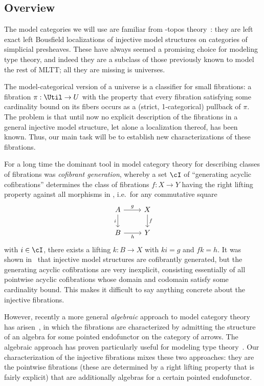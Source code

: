 \subsection{Overview}
\label{sec:overview}

The model categories we will use are familiar from \io-topos theory~\cite{lurie:higher-topoi}: they are left exact left Bousfield localizations of injective model structures on categories of simplicial presheaves.
These have always seemed a promising choice for modeling type theory, and indeed they are a subclass of those previously known to model the rest of MLTT; all they are missing is universes.

The model-categorical version of a universe is a classifier for small fibrations: a fibration $\pi:\Util\to U$ with the property that every fibration satisfying some cardinality bound on its fibers occurs as a (strict, 1-categorical) pullback of $\pi$.
The problem is that until now no explicit description of the fibrations in a general injective model structure, let alone a localization thereof, has been known.
Thus, our main task will be to establish new characterizations of these fibrations.

For a long time the dominant tool in model category theory for describing classes of fibrations was \emph{cofibrant generation}, whereby a set $\cI$ of ``generating acyclic cofibrations'' determines the class of fibrations $f:X\to Y$ having the right lifting property against all morphisms in \cI, i.e.\ for any commutative square
\begin{equation}
  \begin{tikzcd}
    A \ar[d,"i"'] \ar[r,"g"] & X \ar[d,"f"]\\
    B \ar[r,"h"'] & Y
  \end{tikzcd}\label{eq:intro-sq}
\end{equation}
with $i\in \cI$, there exists a lifting $k:B\to X$ with $k i = g$ and $f k = h$.
It was shown in~\cite[A.3.3.3]{lurie:higher-topoi} that injective model structures are cofibrantly generated, but the generating acyclic cofibrations are very inexplicit, consisting essentially of all pointwise acyclic cofibrations whose domain and codomain satisfy some cardinality bound.
This makes it difficult to say anything concrete about the injective fibrations.

However, recently a more general \emph{algebraic} approach to model category theory has arisen~\cite{gt:nwfs,garner:soa,riehl:nwfs-model,bg:awfs-i,rosicky:acc-model}, in which the fibrations are characterized by admitting the structure of an algebra for some pointed endofunctor on the category of arrows.
The algebraic approach has proven particularly useful for modeling type theory~\cite{gb:topsimpid,cchm:cubicaltt,gs:uniform,awodey:qmc-cube}.
Our characterization of the injective fibrations mixes these two approaches: they are the pointwise fibrations (these are determined by a right lifting property that is fairly explicit) that are additionally algebras for a certain pointed endofunctor.

